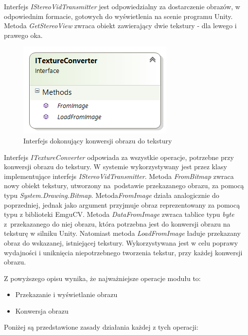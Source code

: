 \documentclass[a4paper,11pt,twoside]{report}
\theoremstyle{definition}
\begin{document}
Interfejs \textit{IStereoVidTransmitter} jest odpowiedzialny za dostarczenie obrazów, w odpowiednim formacie, gotowych do wyświetlenia na scenie programu Unity. Metoda \textit{GetStereoView} zwraca obiekt zawierający dwie tekstury - dla lewego i prawego oka. 

\begin{figure}[h]
\centering
\includegraphics[scale=0.9]{images/ITextureConverter}
\caption[Konwersja diagram]{Interfejs dokonujący konwersji obrazu do tekstury}
\end{figure}

Interfejs \textit{ITextureConverter} odpowiada za wszystkie operacje, potrzebne przy konwersji obrazu do tekstury. W systemie wykorzystywany jest przez klasy implementujące interfejs \textit{IStereoVidTransmitter}. Metoda \textit{FromBitmap} zwraca nowy obiekt tekstury, utworzony na~podstawie przekazanego obrazu, za pomocą typu \textit{System.Drawing.Bitmap}. Metoda\textit{FromImage} działa analogicznie do poprzedniej, jednak jako argument przyjmuje obraz reprezentowany za pomocą typu z biblioteki EmguCV.
Metoda \textit{DataFromImage} zwraca tablice typu \textit{byte} z~przekazanego do niej obrazu, która potrzebna jest do konwersji obrazu na teksturę w silniku Unity. Natomiast metoda \textit{LoadFromImage}  ładuje przekazany obraz do wskazanej, istniejącej tekstury. Wykorzystywana jest w celu poprawy wydajności i uniknięcia niepotrzebnego tworzenia tekstur, przy każdej konwersji obrazu.

Z powyższego opisu wynika, że najważniejsze operacje modułu to:
\begin{itemize}
\item Przekazanie i wyświetlanie obrazu
\item Konwersja obrazu
\end{itemize}

Poniżej są przedstawione zasady działania każdej z tych operacji:
\end{document}
